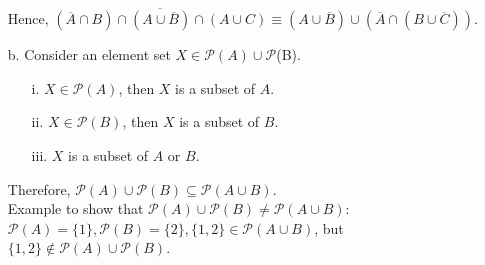 \documentclass{article}
\begin{document}
\begin{enumerate}
          Hence, $\overline{(\overline{A} \cap B) \cap (A \cup \overline{B}) \cap (A \cup C)} \equiv (A \cup \overline{B}) \cup (\overline{A} \cap (B \cup \overline{C}))$.
    \item[b.] Consider an element set $X \in \mathcal{P}(A) \cup \mathcal{P}$(B).
          \begin{enumerate}
              \item[i.] $X \in \mathcal{P}(A)$, then $X$ is a subset of $A$.
              \item[ii.] $X \in \mathcal{P}(B)$, then $X$ is a subset of $B$.
              \item[iii.] $X$ is a subset of $A$ or $B$.
          \end{enumerate}
          Therefore, $\mathcal{P}(A) \cup \mathcal{P}(B) \subseteq \mathcal{P}(A\cup B)$.\\
          Example to show that $\mathcal{P}(A) \cup \mathcal{P}(B) \neq \mathcal{P}(A\cup B)$: $\mathcal{P}(A) = \{1\}, \mathcal{P}(B) = \{2\}, \{1,2\} \in \mathcal{P}(A\cup B)$, but $\{1,2\} \notin \mathcal{P}(A) \cup \mathcal{P}(B)$.
\end{enumerate}
\end{document}
